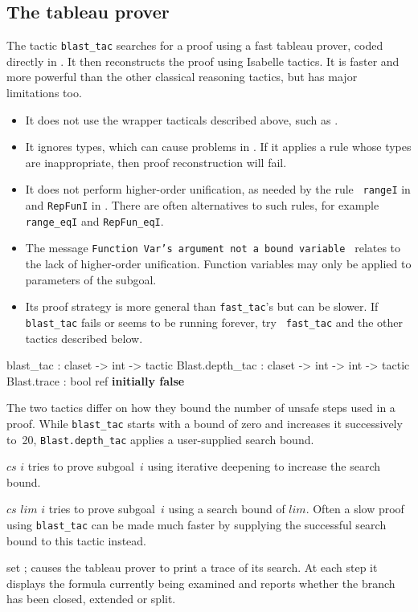\subsection{The tableau prover}
The tactic \texttt{blast_tac} searches for a proof using a fast tableau prover,
coded directly in \ML.  It then reconstructs the proof using Isabelle
tactics.  It is faster and more powerful than the other classical
reasoning tactics, but has major limitations too.
\begin{itemize}
\item It does not use the wrapper tacticals described above, such as
  .
\item It ignores types, which can cause problems in \HOL.  If it applies a rule
  whose types are inappropriate, then proof reconstruction will fail.
\item It does not perform higher-order unification, as needed by the rule {\tt
    rangeI} in {\HOL} and \texttt{RepFunI} in {\ZF}.  There are often
    alternatives to such rules, for example {\tt
    range_eqI} and \texttt{RepFun_eqI}.
\item The message {\small\tt Function Var's argument not a bound variable\ }
relates to the lack of higher-order unification.  Function variables
may only be applied to parameters of the subgoal.
\item Its proof strategy is more general than \texttt{fast_tac}'s but can be
  slower.  If \texttt{blast_tac} fails or seems to be running forever, try {\tt
  fast_tac} and the other tactics described below.
\end{itemize}
%
\begin{ttbox} 
blast_tac        : claset -> int -> tactic
Blast.depth_tac  : claset -> int -> int -> tactic
Blast.trace      : bool ref \hfill{\bf initially false}
\end{ttbox}
The two tactics differ on how they bound the number of unsafe steps used in a
proof.  While \texttt{blast_tac} starts with a bound of zero and increases it
successively to~20, \texttt{Blast.depth_tac} applies a user-supplied search bound.
\begin{ttdescription}
\item[\ttindexbold{blast_tac} $cs$ $i$] tries to prove
  subgoal~$i$ using iterative deepening to increase the search bound.
  
\item[\ttindexbold{Blast.depth_tac} $cs$ $lim$ $i$] tries
  to prove subgoal~$i$ using a search bound of $lim$.  Often a slow
  proof using \texttt{blast_tac} can be made much faster by supplying the
  successful search bound to this tactic instead.
  
\item[set \ttindexbold{Blast.trace};] 
  causes the tableau prover to print a trace of its search.  At each step it
  displays the formula currently being examined and reports whether the branch
  has been closed, extended or split.
\end{ttdescription}


